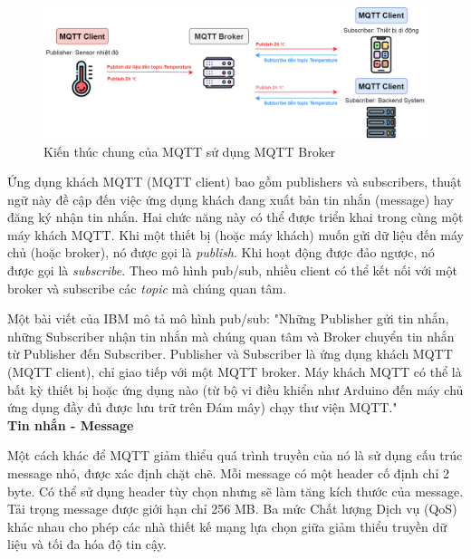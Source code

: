 \begin{figure}[!h]
    \centering
    \includegraphics[width=\textwidth]{Images/Basis_knowledge/MQTTArchitec.png}
    \caption{Kiến thúc chung của MQTT sử dụng MQTT Broker}
    \label{fig:comp_mqtt}
\end{figure}

Ứng dụng khách MQTT (MQTT client) bao gồm publishers và subscribers, thuật ngữ này đề cập đến việc ứng dụng khách đang xuất bản tin nhắn (message) hay đăng ký nhận tin nhắn. Hai chức năng này có thể được triển khai trong cùng một máy khách MQTT. Khi một thiết bị (hoặc máy khách) muốn gửi dữ liệu đến máy chủ (hoặc broker), nó được gọi là \textit{publish}. Khi hoạt động được đảo ngược, nó được gọi là \textit{subscribe}. Theo mô hình pub/sub, nhiều client có thể kết nối với một broker và subscribe các \textit{topic} mà chúng quan tâm.

Một bài viết của IBM mô tả mô hình pub/sub: "Những Publisher gửi tin nhắn, những Subscriber nhận tin nhắn mà chúng quan tâm và Broker chuyển tin nhắn từ Publisher đến Subscriber. Publisher và Subscriber là ứng dụng khách MQTT (MQTT client), chỉ giao tiếp với một MQTT broker. Máy khách MQTT có thể là bất kỳ thiết bị hoặc ứng dụng nào (từ bộ vi điều khiển như Arduino đến máy chủ ứng dụng đầy đủ được lưu trữ trên Đám mây) chạy thư viện MQTT."\\

\textbf{Tin nhắn - Message}

Một cách khác để MQTT giảm thiểu quá trình truyền của nó là sử dụng cấu trúc message nhỏ, được xác định chặt chẽ. Mỗi message có một header cố định chỉ 2 byte. Có thể sử dụng header tùy chọn nhưng sẽ làm tăng kích thước của message. Tải trọng message được giới hạn chỉ 256 MB. Ba mức Chất lượng Dịch vụ (QoS) khác nhau cho phép các nhà thiết kế mạng lựa chọn giữa giảm thiểu truyền dữ liệu và tối đa hóa độ tin cậy.

